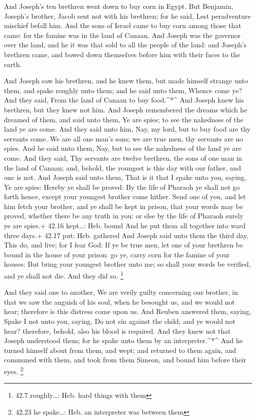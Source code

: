  And Joseph's ten brethren went down to buy corn in Egypt.
 But Benjamin, Joseph's brother, Jacob sent not with his
brethren; for he said, Lest peradventure mischief befall him.
 And the sons of Israel came to buy corn among those that
came: for the famine was in the land of Canaan.  And Joseph
was the governor over the land, and he it was that sold to all the
people of the land: and Joseph's brethren came, and bowed down
themselves before him with their faces to the earth.

 And Joseph saw his brethren, and he knew them, but made
himself strange unto them, and spake roughly unto them; and he said unto
them, Whence come ye? And they said, From the land of Canaan to buy
food.\^{}*\^{}  And Joseph knew his brethren, but they knew
not him.  And Joseph remembered the dreams which he dreamed
of them, and said unto them, Ye are spies; to see the nakedness of the
land ye are come.  And they said unto him, Nay, my lord,
but to buy food are thy servants come.  We are all one
man's sons; we are true men, thy servants are no spies. 
And he said unto them, Nay, but to see the nakedness of the land ye are
come.  And they said, Thy servants are twelve brethren, the
sons of one man in the land of Canaan; and, behold, the youngest is this
day with our father, and one is not.  And Joseph said unto
them, That is it that I spake unto you, saying, Ye are spies:
 Hereby ye shall be proved: By the life of Pharaoh ye shall
not go forth hence, except your youngest brother come hither.
 Send one of you, and let him fetch your brother, and ye
shall be kept in prison, that your words may be proved, whether there be
any truth in you: or else by the life of Pharaoh surely ye are spies.+
42.16 kept\ldots: Heb. bound  And he put them all together
into ward three days.+ 42.17 put: Heb. gathered  And Joseph
said unto them the third day, This do, and live; for I fear God:
 If ye be true men, let one of your brethren be bound in
the house of your prison: go ye, carry corn for the famine of your
houses:  But bring your youngest brother unto me; so shall
your words be verified, and ye shall not die. And they did so.
\footnote{42.7 roughly\ldots: Heb. hard things with them}

 And they said one to another, We are verily guilty
concerning our brother, in that we saw the anguish of his soul, when he
besought us, and we would not hear; therefore is this distress come upon
us.  And Reuben answered them, saying, Spake I not unto
you, saying, Do not sin against the child; and ye would not hear?
therefore, behold, also his blood is required.  And they
knew not that Joseph understood them; for he spake unto them by an
interpreter.\^{}*\^{}  And he turned himself about from
them, and wept; and returned to them again, and communed with them, and
took from them Simeon, and bound him before their eyes. \footnote{42.23
  he spake\ldots: Heb. an interpreter was between them}

